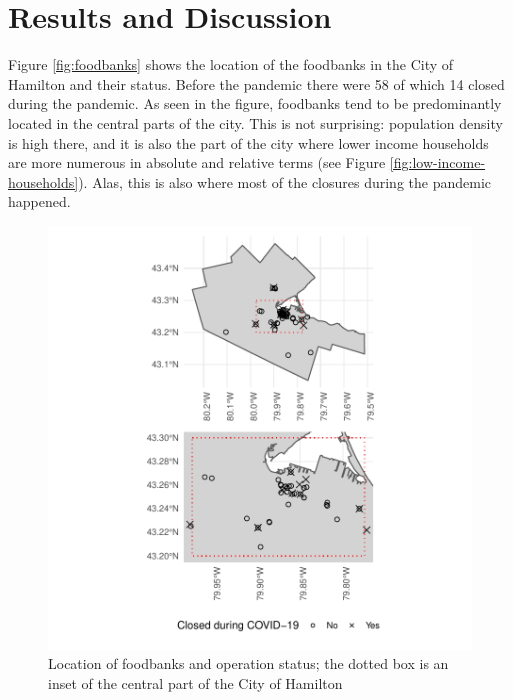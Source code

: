 \documentclass[]{elsarticle} %
\begin{document}
\hypertarget{results-and-discussion}{%
\section{Results and Discussion}\label{results-and-discussion}}

Figure \ref{fig:foodbanks} shows the location of the foodbanks in the
City of Hamilton and their status. Before the pandemic there were 58 of
which 14 closed during the pandemic. As seen in the figure, foodbanks
tend to be predominantly located in the central parts of the city. This
is not surprising: population density is high there, and it is also the
part of the city where lower income households are more numerous in
absolute and relative terms (see Figure
\ref{fig:low-income-households}). Alas, this is also where most of the
closures during the pandemic happened.

\begin{figure}
\includegraphics[width=1\linewidth]{Accessibility-Foodbanks-Hamilton_files/figure-latex/plot-location-foodbanks-1} \caption{\label{fig:foodbanks}Location of foodbanks and operation status; the dotted box is an inset of the central part of the City of Hamilton}\label{fig:plot-location-foodbanks}
\end{figure}
\end{document}

